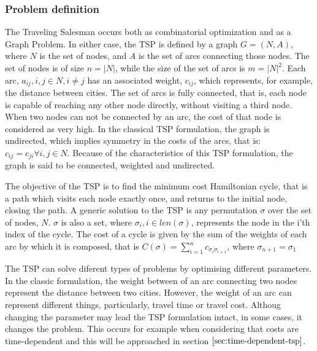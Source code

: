 \subsubsection{Problem definition}
\label{sec:classic_tsp}

The Traveling Salesman occurs both as combinatorial optimization and as a Graph Problem.
In either case, the TSP is defined by a graph $G = (N, A)$, where $N$ is the set of 
nodes, and $A$ is the set of arcs connecting those nodes.
The set of nodes is of size $n = |N|$, while the size of the set of arcs is $m = |N|^2$.
Each arc, $a_{ij}, i, j \in N, i \ne j$ has an associated weight, $c_{ij}$, which represents, for example, the distance between cities.
The set of arcs is fully connected, that is, each node is capable of reaching any other node directly, without visiting a third node.
When two nodes can not be connected by an arc, the cost of that node is considered as very high.
In the classical TSP formulation, the graph is undirected, which implies symmetry in the costs of the arcs, that is: $c_{ij} = c_{ji} \forall i, j \in N$.
Because of the characteristics of this TSP formulation, the graph is said to be connected, weighted and undirected.

The objective of the TSP is to find the minimum cost Hamiltonian cycle, that is a path which visits each node exactly once, and returns to the initial node, closing the path.
A generic solution to the TSP is any permutation $\sigma$ over the set of nodes, $N$. 
$\sigma$ is also a set, where $\sigma_{i}, i \in len(\sigma)$, represents the node in the i'th index of the cycle.
The cost of a cycle is given by the sum of the weights of each arc by which it is composed,
that is $C(\sigma) = \sum_{i=1}^{n} c_{\sigma_{i} \sigma_{i+1}}$, where $\sigma_{n+1} = \sigma_{1}$

The TSP can solve diferent types of problems by optimising different parameters. In the classic formulation,
the weight between of an arc connecting two nodes represent the distance between two cities. However, the weight
of an arc can represent different things, particularly, travel time or travel cost. Althoug changing the parameter
may lead the TSP formulation intact, in some cases, it changes the problem. 
This occurs for example when considering that costs are time-dependent and this will be approached in section $\ref{sec:time-dependent-tsp}$.